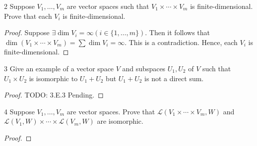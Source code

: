 \documentclass{article}
\newenvironment{problem}[1]{\begin{prob*}{#1}{}}{\end{prob*}}
\begin{document}
\begin{problem}{2}
Suppose $V_1, \ldots , V_m$ are vector spaces such that $V_1 \times \cdots \times V_m$ is finite-dimensional. Prove that each $V_i$ is finite-dimensional.
\end{problem}
\begin{proof}
Suppose $\exists \operatorname{dim} V_i = \infty (i \in \{1, \ldots , m\})$. Then it follows that $\operatorname{dim} (V_1\times \cdots\times V_m) = \sum \operatorname{dim}V_i = \infty$. This is a contradiction. Hence, each $V_i$ is finite-dimensional.
\end{proof}

\begin{problem}{3}
Give an example of a vector space $V$ and subspaces $U_1, U_2$ of $V$ such that $U_1 \times U_2$ is isomorphic to $U_1 + U_2$ but $U_1 + U_2$ is not a direct sum.
\end{problem}
\begin{proof}
TODO: 3.E.3 Pending.
\end{proof}

\begin{problem}{4}
Suppose $V_1, \ldots , V_m$ are vector spaces. Prove that $\mathcal{L}(V_1 \times \cdots\times V_m, W)$ and $\mathcal{L}(V_1, W) \times \cdots \times \mathcal{L}(V_m, W)$ are isomorphic.
\end{problem}
\begin{proof}

\end{proof}

\end{document}
